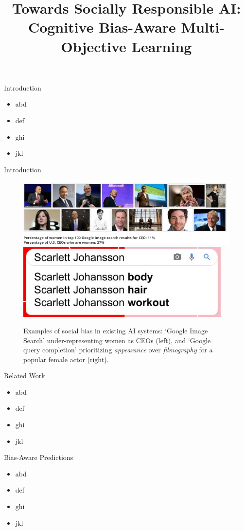 \documentclass{beamer}
\title{Towards Socially Responsible AI: Cognitive Bias-Aware Multi-Objective Learning
}
\begin{document}
\normalsize
\maketitle
%
\begin{frame}{Introduction}
%
\begin{itemize}
\item
abd
\item
def
\item
ghi
\item
jkl
\end{itemize}
\end{frame}
%
\begin{frame}{Introduction}
%
\begin{figure}[t]
    \centering
    \includegraphics[width=.75\columnwidth]{ceo.png}
    \includegraphics[width=.24\columnwidth]{qc.png}
    \caption{Examples of social bias in existing AI systems: `Google Image Search' under-representing women as CEOs (left), and `Google query completion' prioritizing \emph{appearance} over \emph{filmography} for a popular female actor (right).}
    \label{fig:bias-in-existing-AI-tools}
\end{figure}
\end{frame}
%
\begin{frame}{Related Work}
%
\begin{itemize}
\item
abd
\item
def
\item
ghi
\item
jkl
\end{itemize}
\end{frame}
%
\begin{frame}{Bias-Aware Predictions}
%
\begin{itemize}
\item
abd
\item
def
\item
ghi
\item
jkl
\end{itemize}
\end{frame}
\end{document}
